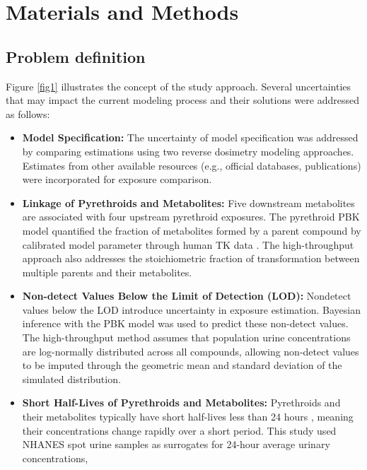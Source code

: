 \documentclass[toxics,article,submit,pdftex,moreauthors]{Definitions/mdpi}
\begin{document}

\section{Materials and Methods}\label{materials-and-methods}

\subsection{Problem definition}\label{problem-definition}

Figure \ref{fig1} illustrates the concept of the study approach. Several
uncertainties that may impact the current modeling process and their solutions
were addressed as follows:

\begin{itemize}
\item
  \textbf{Model Specification:} The uncertainty of model specification
  was addressed by comparing estimations using two reverse dosimetry
  modeling approaches. Estimates from other available resources (e.g.,
  official databases, publications) were incorporated for exposure
  comparison.
\item
  \textbf{Linkage of Pyrethroids and Metabolites:} Five downstream
  metabolites are associated with four upstream pyrethroid exposures.
  The pyrethroid PBK model quantified the fraction of metabolites formed
  by a parent compound by calibrated model parameter through human TK
  data \citep{quindroit2019estimating}. The high-throughput approach
  also addresses the stoichiometric fraction of transformation between
  multiple parents and their metabolites.
\item
  \textbf{Non-detect Values Below the Limit of Detection (LOD):}
  Nondetect values below the LOD introduce uncertainty in exposure
  estimation. Bayesian inference with the PBK model was used to predict
  these non-detect values. The high-throughput method assumes that
  population urine concentrations are log-normally distributed across
  all compounds, allowing non-detect values to be imputed through the
  geometric mean and standard deviation of the simulated distribution.
\item
  \textbf{Short Half-Lives of Pyrethroids and Metabolites:} Pyrethroids
  and their metabolites typically have short half-lives less than 24
  hours \citep{hays2007biomonitoring}, meaning their concentrations
  change rapidly over a short period. This study used NHANES spot urine
  samples as surrogates for 24-hour average urinary concentrations,

\end{itemize}
\end{document}
